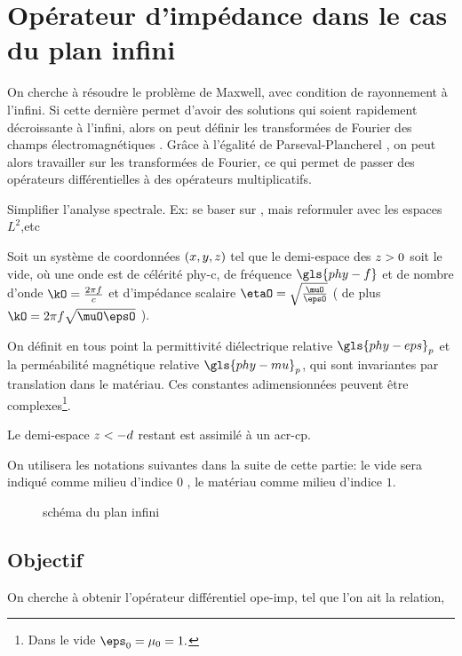 \section{Opérateur d'impédance dans le cas du plan infini}\label{sec:coeffs_ref}

On cherche à résoudre le problème de Maxwell, avec condition de rayonnement à l'infini.
Si cette dernière permet d'avoir des solutions qui soient rapidement décroissante à l'infini, alors on peut définir les transformées de Fourier des champs électromagnétiques \cite[p.~146]{yosida_functional_1995}.
Grâce à l'égalité de Parseval-Plancherel \cite[p.~153]{yosida_functional_1995}, on peut alors travailler sur les transformées de Fourier, ce qui permet de passer des opérateurs différentielles à des opérateurs multiplicatifs.

\begin{TODO}
  Simplifier l'analyse spectrale. Ex: se baser sur \cite[p.~28]{hoppe_impedance_1995}, mais reformuler avec les espaces \(L^2\),etc
\end{TODO}


Soit un système de coordonnées \((\x,\y,\z)\) tel que le demi-espace des \(\z>0\) soit le vide, où une onde est de célérité \gls{phy-c}, de fréquence \(\gls{phy-f}\) et de nombre d'onde \(\kO=\frac{2\pi f}{c}\)  et d'impédance scalaire \(\etaO = \sqrt{\frac{\muO}{\epsO}}\) ( de plus \(\kO=2\pi f\sqrt{\muO\epsO}\) ).

On définit en tous point la permittivité diélectrique relative \(\gls{phy-eps}_p\) et la perméabilité magnétique relative \(\gls{phy-mu}_p\), qui sont invariantes par translation dans le matériau.
Ces constantes adimensionnées peuvent être complexes\footnote{Dans le vide \(\eps_0=\mu_0=1.\)}.

Le demi-espace \(\z<-d\) restant est assimilé à un \gls{acr-cp}.

On utilisera les notations  suivantes dans la suite de cette partie: le vide sera indiqué comme milieu d'indice \(0\) , le matériau comme milieu d'indice \(1\).
\renewcommand{\x}{{x}}
\renewcommand{\y}{{y}}
\renewcommand{\z}{{z}}
\renewcommand{\peps}{{\eps_1}}
\renewcommand{\pmu}{{\mu_1}}
\begin{figure}[h!]
\centering
\begin{tikzpicture}

\end{tikzpicture}
\caption{schéma du plan infini}
\end{figure}\label{fig:tikz:plan}

\subsection{Objectif}
On cherche à obtenir l'opérateur différentiel \gls{ope-imp}, tel que l'on ait la relation,

